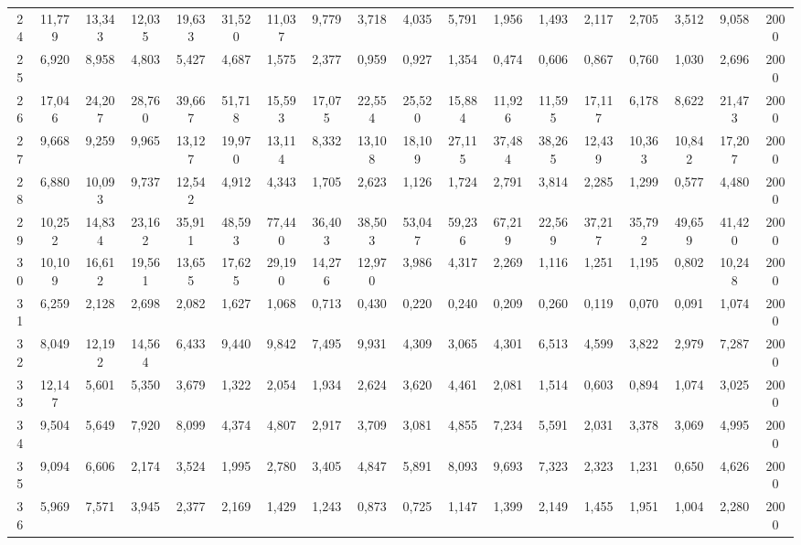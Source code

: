 {\begin{longtable}{ >{\tiny}cccccccccccccccccc}
24  & 11,779 & 13,343 & 12,035 & 19,633 & 31,520 & 11,037 & 9,779  & 3,718  & 4,035  & 5,791  & 1,956  & 1,493   & 2,117   & 2,705   & 3,512   & 9,058   & 2000 \\
25  & 6,920  & 8,958  & 4,803  & 5,427  & 4,687  & 1,575  & 2,377  & 0,959  & 0,927  & 1,354  & 0,474  & 0,606   & 0,867   & 0,760   & 1,030   & 2,696   & 2000 \\
26  & 17,046 & 24,207 & 28,760 & 39,667 & 51,718 & 15,593 & 17,075 & 22,554 & 25,520 & 15,884 & 11,926 & 11,595  & 17,117  & 6,178   & 8,622   & 21,473  & 2000 \\
27  & 9,668  & 9,259  & 9,965  & 13,127 & 19,970 & 13,114 & 8,332  & 13,108 & 18,109 & 27,115 & 37,484 & 38,265  & 12,439  & 10,363  & 10,842  & 17,207  & 2000 \\
28  & 6,880  & 10,093 & 9,737  & 12,542 & 4,912  & 4,343  & 1,705  & 2,623  & 1,126  & 1,724  & 2,791  & 3,814   & 2,285   & 1,299   & 0,577   & 4,480   & 2000 \\
29  & 10,252 & 14,834 & 23,162 & 35,911 & 48,593 & 77,440 & 36,403 & 38,503 & 53,047 & 59,236 & 67,219 & 22,569  & 37,217  & 35,792  & 49,659  & 41,420  & 2000 \\
30  & 10,109 & 16,612 & 19,561 & 13,655 & 17,625 & 29,190 & 14,276 & 12,970 & 3,986  & 4,317  & 2,269  & 1,116   & 1,251   & 1,195   & 0,802   & 10,248  & 2000 \\
31  & 6,259  & 2,128  & 2,698  & 2,082  & 1,627  & 1,068  & 0,713  & 0,430  & 0,220  & 0,240  & 0,209  & 0,260   & 0,119   & 0,070   & 0,091   & 1,074   & 2000 \\
32  & 8,049  & 12,192 & 14,564 & 6,433  & 9,440  & 9,842  & 7,495  & 9,931  & 4,309  & 3,065  & 4,301  & 6,513   & 4,599   & 3,822   & 2,979   & 7,287   & 2000 \\
33  & 12,147 & 5,601  & 5,350  & 3,679  & 1,322  & 2,054  & 1,934  & 2,624  & 3,620  & 4,461  & 2,081  & 1,514   & 0,603   & 0,894   & 1,074   & 3,025   & 2000 \\
34  & 9,504  & 5,649  & 7,920  & 8,099  & 4,374  & 4,807  & 2,917  & 3,709  & 3,081  & 4,855  & 7,234  & 5,591   & 2,031   & 3,378   & 3,069   & 4,995   & 2000 \\
35  & 9,094  & 6,606  & 2,174  & 3,524  & 1,995  & 2,780  & 3,405  & 4,847  & 5,891  & 8,093  & 9,693  & 7,323   & 2,323   & 1,231   & 0,650   & 4,626   & 2000 \\
36  & 5,969  & 7,571  & 3,945  & 2,377  & 2,169  & 1,429  & 1,243  & 0,873  & 0,725  & 1,147  & 1,399  & 2,149   & 1,455   & 1,951   & 1,004   & 2,280   & 2000 \\

\end{longtable}}
